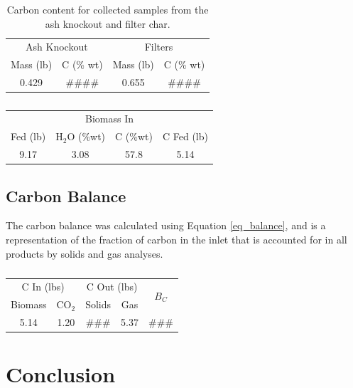 \documentclass[11pt,twocolumn]{article}
\begin{document}
\begin{table}
	\centering
	\caption{Carbon content for collected samples from the ash knockout and filter char.}
	\label{tbl_char}
	\begin{tabular}{c c c c}
	\toprule
	\multicolumn{2}{c}{Ash Knockout}	&	\multicolumn{2}{c}{Filters}	\\
	Mass (lb)	&	C (\% wt)	&	Mass (lb)	&	C (\% wt)	\\
	\midrule
	0.429	&	\#\#\#\#	&	0.655	&	\#\#\#\#	\\
	\bottomrule
	\end{tabular}
\end{table}

\begin{table}
	\centering
	\caption{}
	\label{tbl_biomass}
	\begin{tabular}{c c c c}
	\toprule
	\multicolumn{4}{c}{Biomass In}	\\
	Fed (lb)	&	H$_2$O (\%wt)	&	C (\%wt)	&	C Fed (lb)	\\
	\midrule
	9.17		&	3.08			&	57.8		&	5.14		\\	
	\bottomrule
	\end{tabular}
\end{table}

\subsection*{Carbon Balance}

The carbon balance was calculated using Equation \ref{eq_balance}, and is a representation of the fraction of carbon in the inlet that is accounted for in all products by solids and gas analyses.  

\begin{table}
	\centering
	\caption{}
	\label{tbl_balance}
	\begin{tabular}{c c c c c}
	\toprule
	\multicolumn{2}{c}{C In (lbs)}	&	\multicolumn{2}{c}{C Out (lbs)}	&	\multirow{2}{*}{$B_C$}	\\
	Biomass	&	CO$_2$	&	Solids	&	Gas						&	{}			\\
	\midrule
	5.14		&	1.20		&	\#\#\#	&	5.37						&	\#\#\#		\\
	\bottomrule
	\end{tabular}
\end{table}
\balance
\section*{Conclusion}
\end{document}
